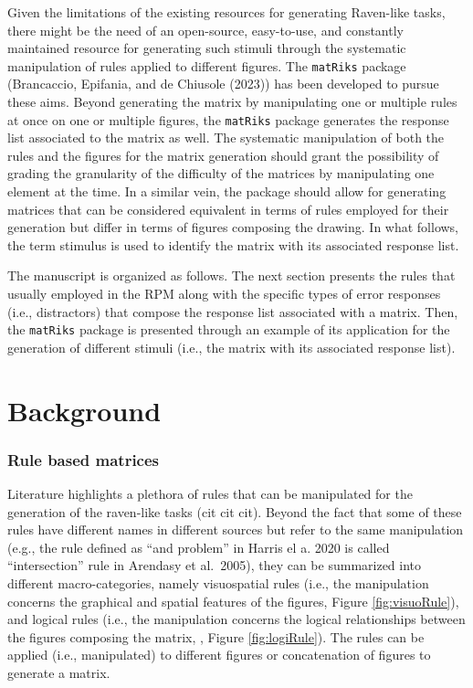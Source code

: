Given the limitations of the existing resources for generating Raven-like tasks, there might be the need of an open-source, easy-to-use, and constantly maintained resource for generating such stimuli through the systematic manipulation of rules applied to different figures.
The \texttt{matRiks} package (Brancaccio, Epifania, and de Chiusole (2023)) has been developed to pursue these aims.
Beyond generating the matrix by manipulating one or multiple rules at once on one or multiple figures, the \texttt{matRiks} package generates the response list associated to the matrix as well.
The systematic manipulation of both the rules and the figures for the matrix generation should grant the possibility of grading the granularity of the difficulty of the matrices by manipulating one element at the time.
In a similar vein, the package should allow for generating matrices that can be considered equivalent in terms of rules employed for their generation but differ in terms of figures composing the drawing. In what follows, the term stimulus is used to identify the matrix with its associated response list.

The manuscript is organized as follows.
The next section presents the rules that usually employed in the RPM along with the specific types of error responses (i.e., distractors) that compose the response list associated with a matrix. Then, the \texttt{matRiks} package is presented through an example of its application for the generation of different stimuli (i.e., the matrix with its associated response list).

\section{Background}\label{background}

\subsubsection{Rule based matrices}\label{rule-based-matrices}

Literature highlights a plethora of rules that can be manipulated for the generation of the raven-like tasks (cit cit cit).
Beyond the fact that some of these rules have different names in different sources but refer to the same manipulation (e.g., the rule defined as ``and problem'' in Harris el a. 2020 is called ``intersection'' rule in Arendasy et al.~2005), they can be summarized into different macro-categories, namely visuospatial rules (i.e., the manipulation concerns the graphical and spatial features of the figures, Figure \ref{fig:visuoRule}), and logical rules (i.e., the manipulation concerns the logical relationships between the figures composing the matrix, , Figure \ref{fig:logiRule}). The rules can be applied (i.e., manipulated) to different figures or concatenation of figures to generate a matrix.

